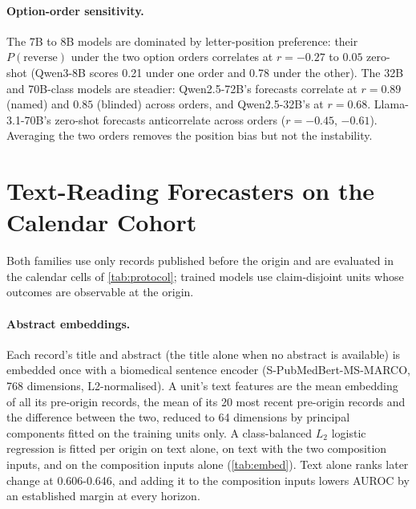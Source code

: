\documentclass[11pt]{article}
\begin{document}
\paragraph{Option-order sensitivity.} The 7B to 8B models are dominated by letter-position
preference: their $P(\text{reverse})$ under the two option orders correlates at $r=-0.27$ to $0.05$
zero-shot (Qwen3-8B scores 0.21 under one order and 0.78 under the other). The 32B and 70B-class
models are steadier: Qwen2.5-72B's forecasts correlate at $r=0.89$ (named) and $0.85$ (blinded)
across orders, and Qwen2.5-32B's at $r=0.68$. Llama-3.1-70B's zero-shot forecasts anticorrelate
across orders ($r=-0.45$, $-0.61$). Averaging the two orders removes the position bias but not the
instability.

\section{Text-Reading Forecasters on the Calendar Cohort}
\label{app:text}
Both families use only records published before the origin and are evaluated in the calendar cells
of \cref{tab:protocol}; trained models use claim-disjoint units whose outcomes are observable at the
origin.

\paragraph{Abstract embeddings.} Each record's title and abstract (the title alone when no abstract
is available) is embedded once with a biomedical sentence encoder (S-PubMedBert-MS-MARCO,
768 dimensions, L2-normalised). A unit's text features are the mean embedding of all its pre-origin
records, the mean of its 20 most recent pre-origin records and the difference between the two,
reduced to 64 dimensions by principal components fitted on the training units only. A class-balanced
$L_2$ logistic regression is fitted per origin on text alone, on text with the two composition inputs,
and on the composition inputs alone (\cref{tab:embed}). Text alone ranks later change at 0.606-0.646, and adding it to the composition
inputs lowers AUROC by an established margin at every horizon.

\begin{table}[!t]\centering\footnotesize
\setlength{\tabcolsep}{3pt}
\caption{Embedding forecasters on the calendar cohort (AUROC). ``Comp.'' is the signed two-variable
score; ``Text added'' is text + composition minus composition, paired over claims.}
\label{tab:embed}
\end{table}
\end{document}
